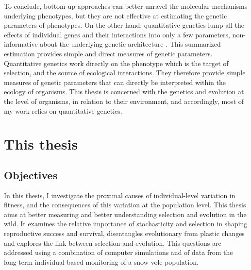 
To conclude, bottom-up approaches can better unravel the molecular mechanisms underlying phenotypes, but they are not effective at estimating the genetic parameters of phenotypes. On the other hand, quantitative genetics lump all the effects of individual genes and their interactions into only a few parameters, non-informative about the underlying genetic architecture \parencite{Mackay2001,Nietlisbach2015,Huang041434}.  This summarized estimation provides simple and direct measures of genetic parameters. Quantitative genetics work directly on the phenotype which is the target of selection, and the source of ecological interactions. They therefore provide simple measures of genetic parameters that can directly be interpreted within the ecology of organisms.
This thesis is concerned with the genetics and evolution at the level of organisms, in relation to their environment, and accordingly, most of my work relies on quantitative genetics.



\section{This thesis}
\subsection{Objectives}
In this thesis, I investigate the proximal causes of individual-level variation in fitness, and the consequences of this variation at the population level. This thesis aims at better measuring and better understanding selection and evolution in the wild. It examines the relative importance of stochasticity and selection in shaping reproductive success and survival, disentangles evolutionary from plastic changes and explores the link between selection and evolution. This questions are addressed using a combination of computer simulations and of data from the long-term individual-based monitoring of a snow vole population.

